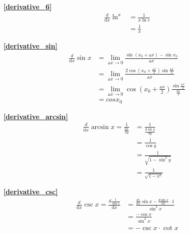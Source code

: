 \textbf{\large \ref{derivative_6}}
\begin{displaymath}
    \begin{split}
        \frac{d}{\mathrm{d}{x}}\ln^x&=\frac{1}{x\ln e}\\
        &=\frac{1}{x}
    \end{split}
\end{displaymath}

\textbf{\large \ref{derivative_sin}}
\begin{displaymath}
    \begin{split}
        \frac{d}{\mathrm{d}{x}}\sin x&=\lim\limits_{\vartriangle x\to 0}\frac{\sin (x_0 +\vartriangle x)-\sin x_0}{\vartriangle x}\\
        &=\lim\limits_{\vartriangle x\to 0}\frac{2\cos(x_0+\frac{\vartriangle x}{2})\sin \frac{\vartriangle x}{2}}{\vartriangle x}\\
        &=\lim\limits_{\vartriangle x\to 0}\cos(x_0+\frac{\vartriangle x}{2})\frac{\sin\frac{\vartriangle x}{2}}{\frac{\vartriangle x}{2}}\\
        &=cos x_0
    \end{split}
\end{displaymath}

\textbf{\large \ref{derivative_arcsin}}
\begin{displaymath}
    \begin{split}
        \frac{d}{\mathrm{d}{x}}\arcsin x=\frac{1}{\frac{dx}{\mathrm{d}{y}}}&=\frac{1}{\frac{d\sin y}{\mathrm{d}{y}}}\\
        &=\frac{1}{\cos y}\\
        &=\frac{1}{\sqrt{1-\sin^2 y}}\\
        &=\frac{1}{\sqrt{1-x^2}}
    \end{split}
\end{displaymath}

\textbf{\large \ref{derivative_csc}}
\begin{displaymath}
    \begin{split}
        \frac{d}{\mathrm{d}{x}}\csc x=\frac{d\frac{1}{\sin x}}{\mathrm{d}{x}}&=\frac{\frac{d 1}{\mathrm{d}{x}}\sin x-\frac{d\sin x}{\mathrm{d}{x}}\cdot 1}{\sin^2x}\\
        &=\frac{-\cos x}{\sin^2x}\\
        &=-\csc x\cdot\cot x
    \end{split}
\end{displaymath}

